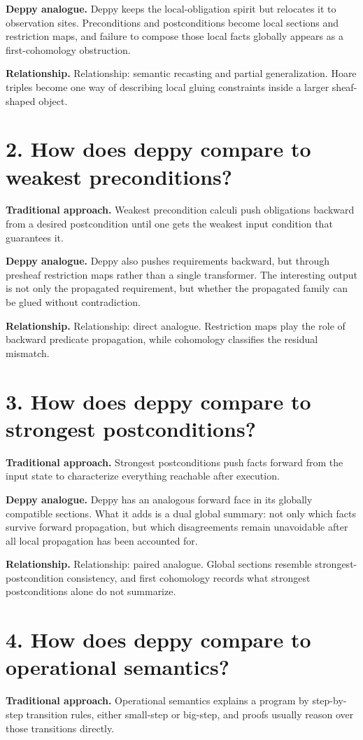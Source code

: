 \documentclass[11pt,openany]{book}
\begin{document}
\textbf{Deppy analogue.} Deppy keeps the local-obligation spirit but relocates it to observation sites. Preconditions and postconditions become local sections and restriction maps, and failure to compose those local facts globally appears as a first-cohomology obstruction.

\textbf{Relationship.} Relationship: semantic recasting and partial generalization. Hoare triples become one way of describing local gluing constraints inside a larger sheaf-shaped object.

\section*{2. How does deppy compare to weakest preconditions?}
\textbf{Traditional approach.} Weakest precondition calculi push obligations backward from a desired postcondition until one gets the weakest input condition that guarantees it.

\textbf{Deppy analogue.} Deppy also pushes requirements backward, but through presheaf restriction maps rather than a single transformer. The interesting output is not only the propagated requirement, but whether the propagated family can be glued without contradiction.

\textbf{Relationship.} Relationship: direct analogue. Restriction maps play the role of backward predicate propagation, while cohomology classifies the residual mismatch.

\section*{3. How does deppy compare to strongest postconditions?}
\textbf{Traditional approach.} Strongest postconditions push facts forward from the input state to characterize everything reachable after execution.

\textbf{Deppy analogue.} Deppy has an analogous forward face in its globally compatible sections. What it adds is a dual global summary: not only which facts survive forward propagation, but which disagreements remain unavoidable after all local propagation has been accounted for.

\textbf{Relationship.} Relationship: paired analogue. Global sections resemble strongest-postcondition consistency, and first cohomology records what strongest postconditions alone do not summarize.

\section*{4. How does deppy compare to operational semantics?}
\textbf{Traditional approach.} Operational semantics explains a program by step-by-step transition rules, either small-step or big-step, and proofs usually reason over those transitions directly.
\end{document}
